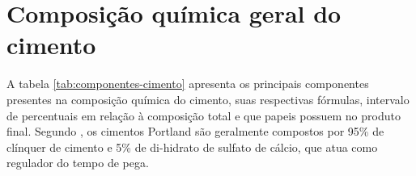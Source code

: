  	\begin{figure}[h!] 
   	    \captionsetup{width=10cm}%
	\end{figure}

\section{Composição química geral do cimento}



A tabela \ref{tab:componentes-cimento} apresenta os principais componentes presentes na composição química do cimento, suas respectivas fórmulas, intervalo de percentuais em relação à composição total e que papeis possuem no produto final. Segundo \cite{composition-portland-cement}, os cimentos Portland são geralmente compostos por 95\% de clínquer de cimento e 5\% de di-hidrato de sulfato de cálcio, que atua como regulador do tempo de pega.

